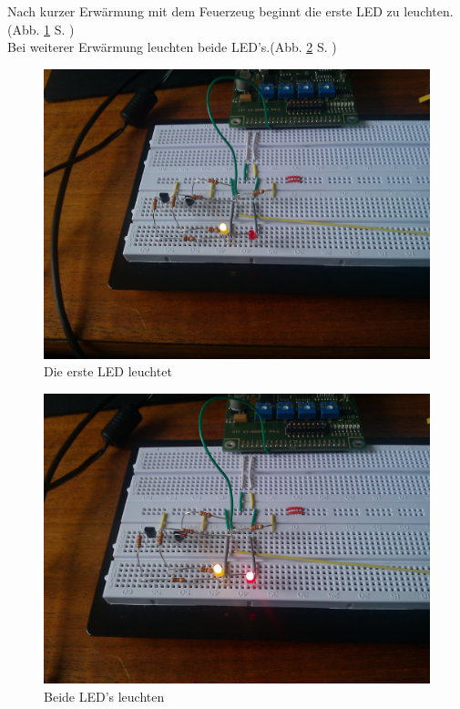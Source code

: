 Nach kurzer Erwärmung mit dem Feuerzeug beginnt die erste LED zu leuchten. (Abb. \ref{fig:ntc-led1} S. \pageref{fig:ntc-led1})\\
Bei weiterer Erwärmung leuchten beide LED's.(Abb. \ref{fig:ntc-led2} S. \pageref{fig:ntc-led2})\\ 

\begin{figure}[h!]
	\centering
	\includegraphics[scale=0.2]{pics/ntc-led1.jpg}
	\caption{Die erste LED leuchtet}
	\label{fig:ntc-led1}
\end{figure}

\begin{figure}[h!]
	\centering
	\includegraphics[scale=0.2]{pics/ntc-led2.jpg}
	\caption{Beide LED's leuchten}
	\label{fig:ntc-led2}
\end{figure}

